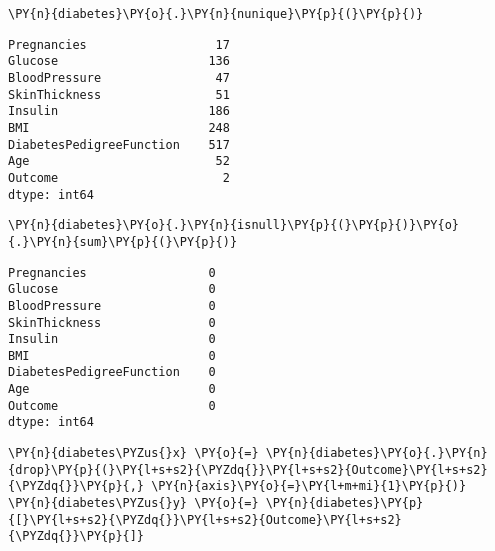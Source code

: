     \begin{tcolorbox}[breakable, size=fbox, boxrule=1pt, pad at break*=1mm,colback=cellbackground, colframe=cellborder]
\begin{Verbatim}[commandchars=\\\{\}]
\PY{n}{diabetes}\PY{o}{.}\PY{n}{nunique}\PY{p}{(}\PY{p}{)}
\end{Verbatim}
\end{tcolorbox}

            \begin{tcolorbox}[breakable, size=fbox, boxrule=.5pt, pad at break*=1mm, opacityfill=0]
\begin{Verbatim}[commandchars=\\\{\}]
Pregnancies                  17
Glucose                     136
BloodPressure                47
SkinThickness                51
Insulin                     186
BMI                         248
DiabetesPedigreeFunction    517
Age                          52
Outcome                       2
dtype: int64
\end{Verbatim}
\end{tcolorbox}
        
    \begin{tcolorbox}[breakable, size=fbox, boxrule=1pt, pad at break*=1mm,colback=cellbackground, colframe=cellborder]
\begin{Verbatim}[commandchars=\\\{\}]
\PY{n}{diabetes}\PY{o}{.}\PY{n}{isnull}\PY{p}{(}\PY{p}{)}\PY{o}{.}\PY{n}{sum}\PY{p}{(}\PY{p}{)}
\end{Verbatim}
\end{tcolorbox}

            \begin{tcolorbox}[breakable, size=fbox, boxrule=.5pt, pad at break*=1mm, opacityfill=0]
\begin{Verbatim}[commandchars=\\\{\}]
Pregnancies                 0
Glucose                     0
BloodPressure               0
SkinThickness               0
Insulin                     0
BMI                         0
DiabetesPedigreeFunction    0
Age                         0
Outcome                     0
dtype: int64
\end{Verbatim}
\end{tcolorbox}
        
    \begin{tcolorbox}[breakable, size=fbox, boxrule=1pt, pad at break*=1mm,colback=cellbackground, colframe=cellborder]
\begin{Verbatim}[commandchars=\\\{\}]
\PY{n}{diabetes\PYZus{}x} \PY{o}{=} \PY{n}{diabetes}\PY{o}{.}\PY{n}{drop}\PY{p}{(}\PY{l+s+s2}{\PYZdq{}}\PY{l+s+s2}{Outcome}\PY{l+s+s2}{\PYZdq{}}\PY{p}{,} \PY{n}{axis}\PY{o}{=}\PY{l+m+mi}{1}\PY{p}{)}
\PY{n}{diabetes\PYZus{}y} \PY{o}{=} \PY{n}{diabetes}\PY{p}{[}\PY{l+s+s2}{\PYZdq{}}\PY{l+s+s2}{Outcome}\PY{l+s+s2}{\PYZdq{}}\PY{p}{]}
\end{Verbatim}
\end{tcolorbox}

